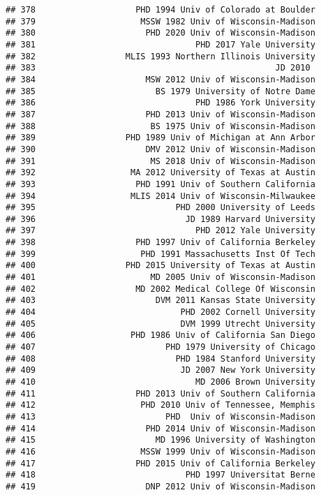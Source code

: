 \documentclass[
]{article}
\begin{document}
\begin{verbatim}
## 378                    PHD 1994 Univ of Colorado at Boulder
## 379                     MSSW 1982 Univ of Wisconsin-Madison
## 380                      PHD 2020 Univ of Wisconsin-Madison
## 381                                PHD 2017 Yale University
## 382                  MLIS 1993 Northern Illinois University
## 383                                                JD 2010 
## 384                      MSW 2012 Univ of Wisconsin-Madison
## 385                        BS 1979 University of Notre Dame
## 386                                PHD 1986 York University
## 387                      PHD 2013 Univ of Wisconsin-Madison
## 388                       BS 1975 Univ of Wisconsin-Madison
## 389                  PHD 1989 Univ of Michigan at Ann Arbor
## 390                      DMV 2012 Univ of Wisconsin-Madison
## 391                       MS 2018 Univ of Wisconsin-Madison
## 392                   MA 2012 University of Texas at Austin
## 393                    PHD 1991 Univ of Southern California
## 394                   MLIS 2014 Univ of Wisconsin-Milwaukee
## 395                            PHD 2000 University of Leeds
## 396                              JD 1989 Harvard University
## 397                                PHD 2012 Yale University
## 398                    PHD 1997 Univ of California Berkeley
## 399                     PHD 1991 Massachusetts Inst Of Tech
## 400                  PHD 2015 University of Texas at Austin
## 401                       MD 2005 Univ of Wisconsin-Madison
## 402                    MD 2002 Medical College Of Wisconsin
## 403                        DVM 2011 Kansas State University
## 404                             PHD 2002 Cornell University
## 405                             DVM 1999 Utrecht University
## 406                   PHD 1986 Univ of California San Diego
## 407                          PHD 1979 University of Chicago
## 408                            PHD 1984 Stanford University
## 409                             JD 2007 New York University
## 410                                MD 2006 Brown University
## 411                    PHD 2013 Univ of Southern California
## 412                     PHD 2010 Univ of Tennessee, Memphis
## 413                          PHD  Univ of Wisconsin-Madison
## 414                      PHD 2014 Univ of Wisconsin-Madison
## 415                        MD 1996 University of Washington
## 416                     MSSW 1999 Univ of Wisconsin-Madison
## 417                    PHD 2015 Univ of California Berkeley
## 418                              PHD 1997 Universitat Berne
## 419                      DNP 2012 Univ of Wisconsin-Madison

\end{verbatim}
\end{document}
